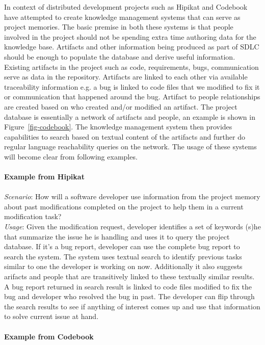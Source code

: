 In context of distributed development projects such as Hipikat\cite{} and Codebook\cite{} have attempted to create knowledge management systems that can serve as project memories. The basic premise in both these systems is that people involved in the project should not be spending extra time authoring data for the knowledge base. Artifacts and other information being produced as part of SDLC should be enough to populate the database and derive useful information. Existing artifacts in the project such as code, requirements, bugs, communication serve as data in the repository. Artifacts are linked to each other via available traceability information e.g. a bug is linked to code files that we modified to fix it or communication that happened around the bug. Artifact to people relationships are created based on who created and/or modified an artifact. The project database is essentially a network of artifacts and people, an example is shown in Figure~\ref{fig-codebook}. The knowledge management system then provides capabilities to search based on textual content of the artifacts and further do regular language reachability queries on the network. The usage of these systems will become clear from following examples.\\
\\
{\bf Example from Hipikat}\\
\\
\textit{Scenario}: How will a software developer use information from the project memory about past modifications completed on the project to help them in a current modification task? \\\textit{Usage}: Given the modification request, developer identifies a set of keywords (s)he that summarize the issue he is handling and uses it to query the project database. If it's a bug report, developer can use the complete bug report to search the system. The system uses textual search to identify previous tasks similar to one the developer is working on now. Additionally it also suggests arifacts and people that are transitively linked to these textually similar results. A bug report returned in search result is linked to code files modified to fix the bug and developer who resolved the bug in past. The developer can flip through the search results to see if anything of interest comes up and use that information to solve current issue at hand.\\
\\
{\bf Example from Codebook}\\
\\ 
